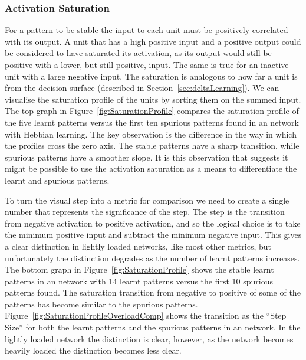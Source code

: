 

\subsubsection{Activation Saturation} %


For a pattern to be stable the input to each unit must be positively correlated with its output.  A unit that has a high positive input and a positive output could be considered to have saturated its activation, as its output would still be positive with a lower, but still positive, input.  The same is true for an inactive unit with a large negative input.  The saturation is analogous to how far a unit is from the decision surface (described in Section~\ref{sec:deltaLearning}). We can visualise the saturation profile of the units by sorting them on the summed input. The top graph in Figure~\ref{fig:SaturationProfile} compares the saturation profile of the five learnt patterns versus the first ten spurious patterns found in an  network with Hebbian learning. The key observation is the difference in the way in which the profiles cross the zero axis.  The stable patterns have a sharp transition, while spurious patterns have a smoother slope. It is this observation that suggests it might be possible to use the activation saturation as a means to differentiate the learnt and spurious patterns. 

To turn the visual step into a metric for comparison we need to create a single number that represents the significance of the step.  The step is the transition from negative activation to positive activation, and so the logical choice is to take the minimum positive input and subtract the minimum negative input.  This gives a clear distinction in lightly loaded networks, like most other metrics, but unfortunately the distinction degrades as the number of learnt patterns increases.  The bottom graph in Figure~\ref{fig:SaturationProfile} shows the stable learnt patterns in an \hopnet{100\pm}{} network with 14 learnt patterns versus the first 10 spurious patterns found.  The saturation transition from negative to positive of some of the patterns has become similar to the spurious patterns. Figure~\ref{fig:SaturationProfileOverloadComp} shows the transition as the ``Step Size'' for both the learnt patterns and the spurious patterns in an \hopnet{100\pm}{} network.  In the lightly loaded network the distinction is clear, however, as the network becomes heavily loaded the distinction becomes less clear. 

